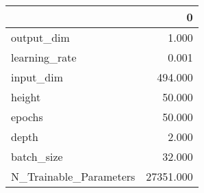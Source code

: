 \begin{tabular}{lr}
\toprule
{} &          0 \\
\midrule
output\_dim             &      1.000 \\
learning\_rate          &      0.001 \\
input\_dim              &    494.000 \\
height                 &     50.000 \\
epochs                 &     50.000 \\
depth                  &      2.000 \\
batch\_size             &     32.000 \\
N\_Trainable\_Parameters &  27351.000 \\
\bottomrule
\end{tabular}
